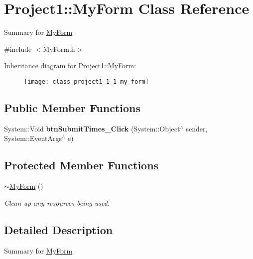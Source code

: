 \hypertarget{class_project1_1_1_my_form}{}\section{Project1\+:\+:My\+Form Class Reference}
\label{class_project1_1_1_my_form}


Summary for \mbox{\hyperlink{class_project1_1_1_my_form}{My\+Form}}  




{\ttfamily \#include $<$My\+Form.\+h$>$}

Inheritance diagram for Project1\+:\+:My\+Form\+:\begin{figure}[H]
\begin{center}
\leavevmode
\texttt{[image: class\_project1\_1\_1\_my\_form]}
\end{center}
\end{figure}
\subsection*{Public Member Functions}
\begin{DoxyCompactItemize}
\item 
\mbox{\label{class_project1_1_1_my_form_ad665941610f014595ab9c9ca8e931765}} 
System\+::\+Void {\bfseries btn\+Submit\+Times\+\_\+\+Click} (System\+::\+Object$^\wedge$ sender, System\+::\+Event\+Args$^\wedge$ e)
\end{DoxyCompactItemize}
\subsection*{Protected Member Functions}
\begin{DoxyCompactItemize}
\item 
\mbox{\hyperlink{class_project1_1_1_my_form_a501b2b4481b72877fc73101f1d6f26be}{$\sim$\+My\+Form}} ()
\begin{DoxyCompactList}\small\item\em Clean up any resources being used. \end{DoxyCompactList}\end{DoxyCompactItemize}


\subsection{Detailed Description}
Summary for \mbox{\hyperlink{class_project1_1_1_my_form}{My\+Form}} 



